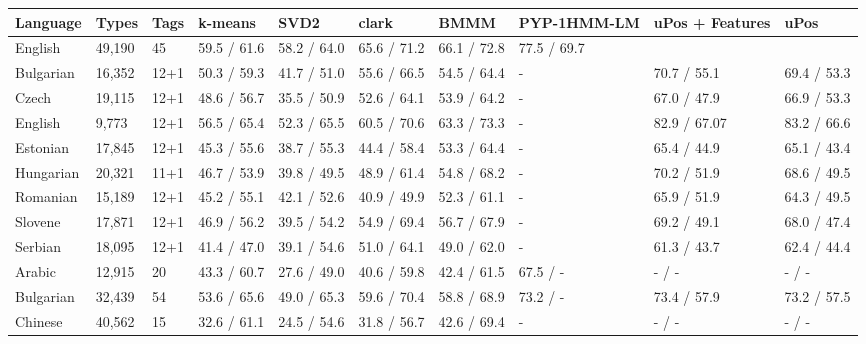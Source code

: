\begin{table}
  \begin{tabular}{|l|l|l|l|l|l|l|l|l|l|}
        \hline
        Language   & Types   & Tags & k-means      & SVD2         & clark        & BMMM         & PYP-1HMM-LM & uPos + Features & uPos        \\ \hline
        English    & 49,190  & 45   & 59.5 / 61.6   & 58.2 / 64.0   & 65.6 / 71.2   & 66.1 / 72.8   & 77.5 / 69.7 & ~               & ~           \\ \hline
        Bulgarian  & 16,352  & 12+1 & 50.3 / 59.3   & 41.7 / 51.0   & 55.6 / 66.5   & 54.5 / 64.4   & -           & 70.7 / 55.1     & 69.4 / 53.3 \\ \hline
        Czech      & 19,115  & 12+1 & 48.6 / 56.7   & 35.5 / 50.9   & 52.6 / 64.1   & 53.9 / 64.2   & -           & 67.0 / 47.9     & 66.9 / 53.3 \\ \hline
        English    & 9,773   & 12+1 & 56.5 / 65.4   & 52.3 / 65.5   & 60.5 / 70.6   & 63.3 / 73.3   & -           & 82.9 / 67.07    & 83.2 / 66.6 \\ \hline
        Estonian   & 17,845  & 12+1 & 45.3 / 55.6   & 38.7 / 55.3   & 44.4 / 58.4   & 53.3 / 64.4   & -           & 65.4 / 44.9     & 65.1 / 43.4 \\ \hline
        Hungarian  & 20,321  & 11+1 & 46.7 / 53.9   & 39.8 / 49.5   & 48.9 / 61.4   & 54.8 / 68.2   & -           & 70.2 / 51.9     & 68.6 / 49.5 \\ \hline
        Romanian   & 15,189  & 12+1 & 45.2 / 55.1   & 42.1 / 52.6   & 40.9 / 49.9   & 52.3 / 61.1   & -           & 65.9 / 51.9     & 64.3 / 49.5 \\ \hline
        Slovene    & 17,871  & 12+1 & 46.9 / 56.2   & 39.5 / 54.2   & 54.9 / 69.4   & 56.7 / 67.9   & -           & 69.2 / 49.1     & 68.0 / 47.4 \\ \hline
        Serbian    & 18,095  & 12+1 & 41.4 / 47.0   & 39.1 / 54.6   & 51.0 / 64.1   & 49.0 / 62.0   & -           & 61.3 / 43.7     & 62.4 / 44.4 \\ \hline
        Arabic     & 12,915  & 20   & 43.3 / 60.7   & 27.6 / 49.0   & 40.6 / 59.8   & 42.4 / 61.5   & 67.5 / -    & - / -           & - / -       \\ \hline
        Bulgarian  & 32,439  & 54   & 53.6 / 65.6   & 49.0 / 65.3   & 59.6 / 70.4   & 58.8 / 68.9   & 73.2 / -    & 73.4 / 57.9     & 73.2 / 57.5 \\ \hline
        Chinese    & 40,562  & 15   & 32.6 / 61.1   & 24.5 / 54.6   & 31.8 / 56.7   & 42.6 / 69.4   & -           & - / -           & - / -       \\ \hline

\end{tabular}
\end{table}
